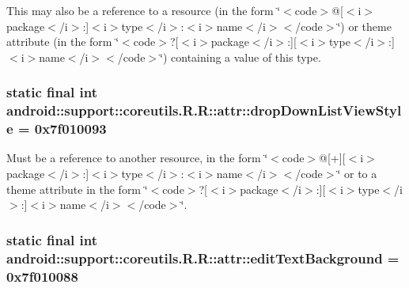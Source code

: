 This may also be a reference to a resource (in the form \char`\"{}$<$code$>$@\mbox{[}$<$i$>$package$<$/i$>$:\mbox{]}$<$i$>$type$<$/i$>$:$<$i$>$name$<$/i$>$$<$/code$>$\char`\"{}) or theme attribute (in the form \char`\"{}$<$code$>$?\mbox{[}$<$i$>$package$<$/i$>$:\mbox{]}\mbox{[}$<$i$>$type$<$/i$>$:\mbox{]}$<$i$>$name$<$/i$>$$<$/code$>$\char`\"{}) containing a value of this type. \hypertarget{classandroid_1_1support_1_1coreutils_1_1_r_1_1attr_c58464ada34fc23158f96091b8e9a751}{
\subsubsection[{dropDownListViewStyle}]{\setlength{\rightskip}{0pt plus 5cm}static final int android::support::coreutils.R.R::attr::dropDownListViewStyle = 0x7f010093}}
\label{classandroid_1_1support_1_1coreutils_1_1_r_1_1attr_c58464ada34fc23158f96091b8e9a751}


Must be a reference to another resource, in the form \char`\"{}$<$code$>$@\mbox{[}+\mbox{]}\mbox{[}$<$i$>$package$<$/i$>$:\mbox{]}$<$i$>$type$<$/i$>$:$<$i$>$name$<$/i$>$$<$/code$>$\char`\"{} or to a theme attribute in the form \char`\"{}$<$code$>$?\mbox{[}$<$i$>$package$<$/i$>$:\mbox{]}\mbox{[}$<$i$>$type$<$/i$>$:\mbox{]}$<$i$>$name$<$/i$>$$<$/code$>$\char`\"{}. \hypertarget{classandroid_1_1support_1_1coreutils_1_1_r_1_1attr_66c34be0f3aa4d6418034c3d702d42c0}{
\subsubsection[{editTextBackground}]{\setlength{\rightskip}{0pt plus 5cm}static final int android::support::coreutils.R.R::attr::editTextBackground = 0x7f010088}}
\label{classandroid_1_1support_1_1coreutils_1_1_r_1_1attr_66c34be0f3aa4d6418034c3d702d42c0}


